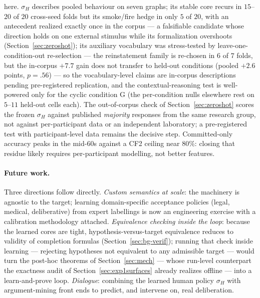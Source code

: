\documentclass[review,12pt]{elsarticle}
\theoremstyle{definition}
\theoremstyle{remark}
\begin{document}
here. $\sigma_H$ describes pooled behaviour on seven
graphs; its stable core recurs in $15$--$20$ of $20$ cross-seed folds but its
smoke/fire hedge in only $5$ of $20$, with an antecedent realized exactly
once in the corpus --- a falsifiable candidate whose direction holds on one
external stimulus while its formalization overshoots
(Section~\ref{sec:zeroshot}); its
auxiliary vocabulary was stress-tested by leave-one-condition-out
re-selection --- the reinstatement family is re-chosen in $6$ of $7$ folds,
but the in-corpus $+7.7$ gain does not transfer to held-out conditions
(pooled $+2.6$ points, $p{=}.56$) --- so the vocabulary-level claims are
in-corpus descriptions pending pre-registered replication, and the contextual-reasoning test is well-powered only for the
cyclic condition G (the per-condition nulls elsewhere rest on $5$--$11$
held-out cells each). The out-of-corpus check of Section~\ref{sec:zeroshot}
scores the frozen $\sigma_H$ against published \emph{majority} responses from
the same research group, not against per-participant data or an independent
laboratory; a pre-registered test with participant-level data remains the
decisive step. Committed-only accuracy peaks in the mid-$60$s against a
CF2 ceiling near $80\%$: closing that residue likely requires per-participant
modelling, not better features.

\paragraph{Future work.} Three directions follow directly. \emph{Custom
semantics at scale}: the machinery is agnostic to the target; learning
domain-specific acceptance policies (legal, medical, deliberative) from expert
labellings is now an engineering exercise with a calibration methodology
attached. \emph{Equivalence checking inside the loop}: because the learned
cores are tight, hypothesis-versus-target equivalence reduces to validity of
completion formulas (Section~\ref{sec:bg-verif}); running that check inside
learning --- rejecting hypotheses not equivalent to any admissible target ---
would turn the post-hoc theorems of Section~\ref{sec:mech} --- whose
run-level counterpart the exactness audit of Section~\ref{sec:exp1surfaces}
already realizes offline --- into a learn-and-prove loop. \emph{Dialogue}: combining the learned human policy
$\sigma_H$ with argument-mining front ends to predict, and intervene on, real
deliberation.

\appendix
\end{document}

